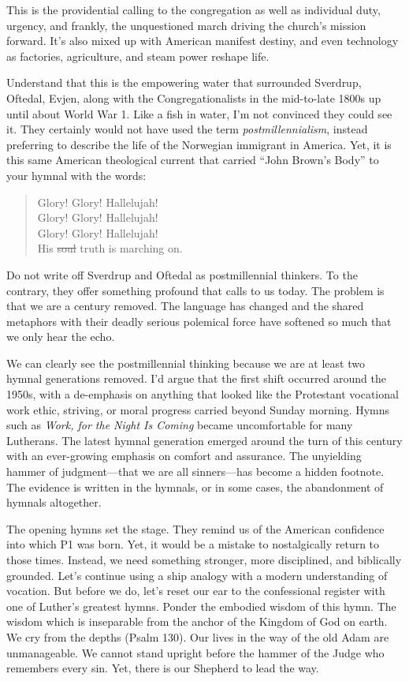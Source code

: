 This is the providential calling to the congregation as well as individual duty, urgency, and frankly, the unquestioned march driving the church's mission forward. It's also mixed up with American manifest destiny, and even technology as factories, agriculture, and steam power reshape life.


Understand that this is the empowering water that surrounded Sverdrup, Oftedal, Evjen, along with the Congregationalists in the mid-to-late 1800s up until about World War 1. Like a fish in water, I'm not convinced they could see it. They certainly would not have used the term \emph{postmillennialism}, instead preferring to describe the life of the Norwegian immigrant in America. Yet, it is this same American theological current that carried ``John Brown's Body'' to your hymnal with the words:

\begin{quote}
Glory! Glory! Hallelujah!\\
Glory! Glory! Hallelujah!\\
Glory! Glory! Hallelujah!\\
His \st{soul} truth is marching on.
\end{quote}


Do not write off Sverdrup and Oftedal as postmillennial thinkers. To the contrary, they offer something profound that calls to us today. The problem is that we are a century removed. The language has changed and the shared metaphors with their deadly serious polemical force have softened so much that we only hear the echo. 

We can clearly see the postmillennial thinking because we are at least two hymnal generations removed. I'd argue that the first shift occurred around the 1950s, with a de-emphasis on anything that looked like the Protestant vocational work ethic, striving, or moral progress carried beyond Sunday morning. Hymns such as \textit{Work, for the Night Is Coming} became uncomfortable for many Lutherans. The latest hymnal generation emerged around the turn of this century with an ever-growing emphasis on comfort and assurance. The unyielding hammer of judgment---that we are all sinners---has become a hidden footnote. The evidence is written in the hymnals, or in some cases, the abandonment of hymnals altogether.

The opening hymns set the stage. They remind us of the American confidence into which P1 was born. Yet, it would be a mistake to nostalgically return to those times. Instead, we need something stronger, more disciplined, and biblically grounded. Let's continue using a ship analogy with a modern understanding of vocation. But before we do, let's reset our ear to the confessional register with one of Luther's greatest hymns. Ponder the embodied wisdom of this hymn. The wisdom which is inseparable from the anchor of the Kingdom of God on earth. We cry from the depths (Psalm 130). Our lives in the way of the old Adam are unmanageable. We cannot stand upright before the hammer of the Judge who remembers every sin. Yet, there is our Shepherd to lead the way.

